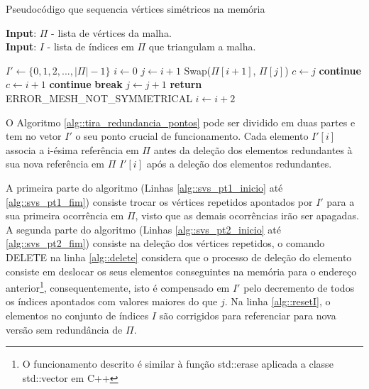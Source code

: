  \begin{algorithm}
 \caption{Pseudocódigo que sequencia vértices simétricos na memória}
 \label{alg::reordena_simetricos}
  \hspace*{\algorithmicindent} \textbf{Input}: $\Pi$ - lista de vértices da malha.\\
\hspace*{\algorithmicindent} \textbf{Input}: $I$ - lista de índices em $\Pi$ que triangulam a malha.
 \begin{algorithmic}[1]
 \State $I' \gets \{0, 1, 2, ..., |\Pi| - 1\}$
 \State $i \gets 0$
     \State $j \gets i + 1$
         \If {$\Pi[i] = -\Pi[j]$}
             \State Swap($\Pi[i+1]$, $\Pi[j]$) \label{alg::troca}
              \label{alg::compensacao_inicio}
                    \State $c \gets j$
                    \State \textbf{continue}
                    \State $c \gets i+1$
                    \State \textbf{continue}
                \EndIf
             \EndFor
             \State \textbf{break}
         \EndIf 
         \State $j \gets j + 1$
            \State \textbf{return} ERROR\_MESH\_NOT\_SYMMETRICAL
         \EndIf
     \EndWhile \label{alg::compensacao_fim}
     \State $i \gets i + 2$
\EndWhile
 \EndProcedure
 \end{algorithmic}
 \end{algorithm}
 
 O Algoritmo \ref{alg::tira_redundancia_pontos} pode ser dividido em duas partes e tem no vetor $I'$ o seu ponto crucial de funcionamento. Cada elemento $I'[i]$ associa a i-ésima referência em $\Pi$ antes da deleção dos elementos redundantes à sua nova referência em $\Pi$ $I'[i]$ após a deleção dos elementos redundantes.
 
 A primeira parte do algoritmo (Linhas \ref{alg::svs_pt1_inicio} até \ref{alg::svs_pt1_fim}) consiste trocar os vértices repetidos apontados por $I'$ para a sua primeira ocorrência em $\Pi$, visto que as demais ocorrências irão ser apagadas. A segunda parte do algoritmo (Linhas \ref{alg::svs_pt2_inicio} até \ref{alg::svs_pt2_fim}) consiste na deleção dos vértices repetidos, o comando DELETE na linha \ref{alg::delete} considera que o processo de deleção do elemento consiste em deslocar os seus elementos conseguintes na memória para o endereço anterior\footnote{O funcionamento descrito é similar à função std::erase aplicada a classe std::vector em C++}, consequentemente, isto é compensado em $I'$ pelo decremento de todos os índices apontados com valores maiores do que $j$. Na linha \ref{alg::resetI}, o elementos no conjunto de índices $I$ são corrigidos para referenciar para nova versão sem redundância de $\Pi$.
 
